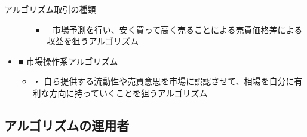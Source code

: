 \documentclass[dvipdfmx, autodetect-engine, aspectratio=169, 10.5pt]{beamer}
\begin{document}
\begin{frame}{アルゴリズム取引の種類}
\begin{itemize}
\begin{itemize}
			            \begin{itemize}
				            \item - 市場予測を行い、安く買って高く売ることによる売買価格差による収益を狙うアルゴリズム
			            \end{itemize}
		      \end{itemize}
		\item ■ 市場操作系アルゴリズム
		      \begin{itemize}
			      \item ・ 自ら提供する流動性や売買意思を市場に誤認させて、相場を自分に有利な方向に持っていくことを狙うアルゴリズム
		      \end{itemize}
	\end{itemize}
\end{frame}

\subsection{アルゴリズムの運用者}
\end{document}
